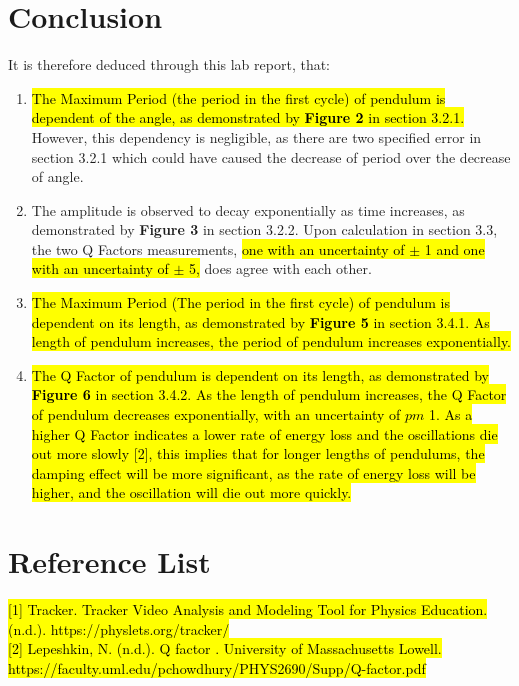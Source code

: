 \documentclass{article}
\begin{document}
\section{Conclusion}
It is therefore deduced through this lab report, that:
\begin{enumerate}

 \item \hl{The Maximum Period (the period in the first cycle) of pendulum is dependent of the angle, as demonstrated by \textbf{Figure 2} in section 3.2.1. }However, this dependency is negligible, as there are two specified error in section 3.2.1 which could have caused the decrease of period over the decrease of angle. 
 \item The amplitude is observed to decay exponentially as time increases, as demonstrated by \textbf{Figure 3} in section 3.2.2. Upon calculation in section 3.3, the two Q Factors measurements,\hl{ one with an uncertainty of $\pm$ 1 and one with an uncertainty of $\pm$ 5,} does agree with each other.
 \item \hl{The Maximum Period (The period in the first cycle) of pendulum is dependent on its length, as demonstrated by \textbf{Figure 5} in section 3.4.1. As length of pendulum increases, the period of pendulum increases exponentially.}
 \item \hl{The Q Factor of pendulum is dependent on its length, as demonstrated by \textbf{Figure 6} in section 3.4.2. As the length of pendulum increases, the Q Factor of pendulum decreases exponentially, with an uncertainty of $pm$ 1. As a higher Q Factor indicates a lower rate of energy loss and the oscillations die out more slowly [2], this implies that for longer lengths of pendulums, the damping effect will be more significant, as the rate of energy loss will be higher, and the oscillation will die out more quickly.}

\end{enumerate}

\section{Reference List}

\hl{[1] Tracker. Tracker Video Analysis and Modeling Tool for Physics Education. (n.d.). https://physlets.org/tracker/ \\}
\noindent  \hl{[2] Lepeshkin, N. (n.d.). Q factor . University of Massachusetts Lowell. \\}
\hl{https://faculty.uml.edu/pchowdhury/PHYS2690/Supp/Q-factor.pdf }
\end{document}
